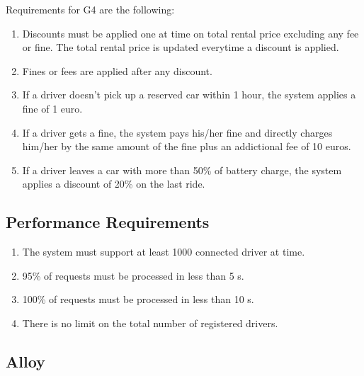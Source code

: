 
Requirements for G4 are the following:

\begin{enumerate}
	\item Discounts must be applied one at time on total rental price excluding any fee or fine. The total rental price is updated everytime a discount is applied.
	\item Fines or fees are applied after any discount.
	\item If a driver doesn't pick up a reserved car within 1 hour, the system applies a fine of 1 euro.
	\item If a driver gets a fine, the system pays his/her fine and directly charges him/her by the same amount of the fine plus an addictional fee of 10 euros.
	\item If a driver leaves a car with more than 50\% of battery charge, the system applies a discount of 20\% on the last ride.
\end{enumerate}

\subsection{Performance Requirements}

\begin{enumerate}
	\item The system must support at least 1000 connected driver at time.
	\item 95\% of requests must be processed in less than 5 s.
	\item 100\% of requests must be processed in less than 10 s.
	\item There is no limit on the total number of registered drivers.
\end{enumerate}

\subsection{Alloy}


